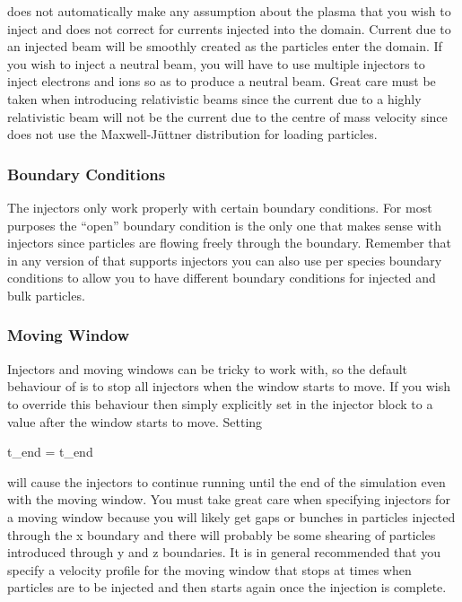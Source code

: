 {\EPOCH} does not automatically make any assumption about the plasma that you
wish to inject and does not correct for currents injected into the domain.
Current due to an injected beam will be smoothly created as the particles enter
the domain. If you wish to inject a neutral beam, you will have to use multiple
injectors to inject electrons and ions so as to produce a neutral beam. Great
care must be taken when introducing relativistic beams since the current due
to a highly relativistic beam will not be the current due to the centre of mass
velocity since {\EPOCH} does not use the Maxwell-J\"{u}ttner distribution for
loading particles.

\subsubsection{Boundary Conditions}

The injectors only work properly with certain boundary conditions. For most
purposes the ``open'' boundary condition is the only one that makes sense with
injectors since particles are flowing freely through the boundary. Remember
that in any version of {\EPOCH} that supports injectors you can also use per
species boundary conditions to allow you to have different boundary conditions
for injected and bulk particles.

\subsubsection{Moving Window}

Injectors and moving windows can be tricky to work with, so the default
behaviour of {\EPOCH} is to stop all injectors when the window starts to move.
If you wish to override this behaviour then simply explicitly set
 in the injector block to a value after the window starts
to move. Setting
\begin{boxverbatim}
t_end = t_end
\end{boxverbatim}
will cause the injectors to continue running until the end of the simulation
even with the moving window. You must take great care when specifying injectors
for a moving window because you will likely get gaps or bunches in particles
injected through the x boundary and there will probably be some shearing of
particles introduced through y and z boundaries. It is in general recommended
that you specify a velocity profile for the moving window that stops at times
when particles are to be injected and then starts again once the injection is
complete.


